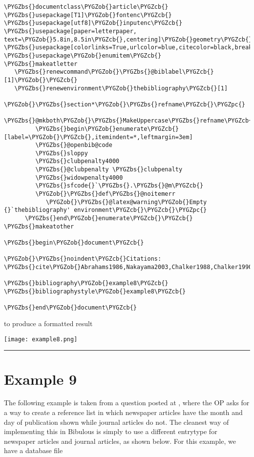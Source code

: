 \documentclass[letterpaper,10pt,english]{sphinxmanual}
\def\PYGZbs{\char`\\}
\def\PYGZob{\char`\{}
\def\PYGZcb{\char`\}}
\def\PYGZpc{\char`\%}
\begin{document}
\begin{Verbatim}[commandchars=\\\{\}]
\PYGZbs{}documentclass\PYGZob{}article\PYGZcb{}
\PYGZbs{}usepackage[T1]\PYGZob{}fontenc\PYGZcb{}
\PYGZbs{}usepackage[utf8]\PYGZob{}inputenc\PYGZcb{}
\PYGZbs{}usepackage[paper=letterpaper, text=\PYGZob{}5.8in,8.5in\PYGZcb{},centering]\PYGZob{}geometry\PYGZcb{}
\PYGZbs{}usepackage[colorlinks=True,urlcolor=blue,citecolor=black,breaklinks=true]\PYGZob{}hyperref\PYGZcb{}
\PYGZbs{}usepackage\PYGZob{}enumitem\PYGZcb{}
\PYGZbs{}makeatletter
   \PYGZbs{}renewcommand\PYGZob{}\PYGZbs{}@biblabel\PYGZcb{}[1]\PYGZob{}\PYGZcb{}
   \PYGZbs{}renewenvironment\PYGZob{}thebibliography\PYGZcb{}[1]
      \PYGZob{}\PYGZbs{}section*\PYGZob{}\PYGZbs{}refname\PYGZcb{}\PYGZpc{}
         \PYGZbs{}@mkboth\PYGZob{}\PYGZbs{}MakeUppercase\PYGZbs{}refname\PYGZcb{}\PYGZob{}\PYGZbs{}MakeUppercase\PYGZbs{}refname\PYGZcb{}\PYGZpc{}
         \PYGZbs{}begin\PYGZob{}enumerate\PYGZcb{}[label=\PYGZob{}\PYGZcb{},itemindent=*,leftmargin=3em]
         \PYGZbs{}@openbib@code
         \PYGZbs{}sloppy
         \PYGZbs{}clubpenalty4000
         \PYGZbs{}@clubpenalty \PYGZbs{}clubpenalty
         \PYGZbs{}widowpenalty4000
         \PYGZbs{}sfcode{}`\PYGZbs{}.\PYGZbs{}@m\PYGZcb{}
         \PYGZob{}\PYGZbs{}def\PYGZbs{}@noitemerr
            \PYGZob{}\PYGZbs{}@latex@warning\PYGZob{}Empty {}`thebibliography' environment\PYGZcb{}\PYGZcb{}\PYGZpc{}
      \PYGZbs{}end\PYGZob{}enumerate\PYGZcb{}\PYGZcb{}
\PYGZbs{}makeatother

\PYGZbs{}begin\PYGZob{}document\PYGZcb{}

\PYGZob{}\PYGZbs{}noindent\PYGZcb{}Citations: \PYGZbs{}cite\PYGZob{}Abrahams1986,Nakayama2003,Chalker1988,Chalker1990,Pook1991\PYGZcb{}

\PYGZbs{}bibliography\PYGZob{}example8\PYGZcb{}
\PYGZbs{}bibliographystyle\PYGZob{}example8\PYGZcb{}

\PYGZbs{}end\PYGZob{}document\PYGZcb{}
\end{Verbatim}

to produce a formatted result

\texttt{[image: example8.png]}


\bigskip\hrule{}\bigskip



\section{Example 9}
\label{examples:example-9}
The following example is taken from a question posted at , where the OP asks for a way to create a reference list in which newspaper articles have the month and day of publication shown while journal articles do not. The cleanest way of implementing this in Bibulous is simply to use a different entrytype for newspaper articles and journal articles, as shown below. For this example, we have a database file
\end{document}
